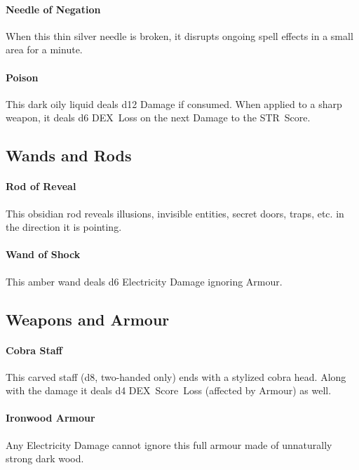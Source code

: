 \documentclass[itdr]{subfiles}
\begin{document}
\paragraph{Needle of Negation}
When this thin silver needle is broken, it disrupts ongoing spell effects in a small area for a minute.

\paragraph{Poison}
This dark oily liquid deals d12 Damage if consumed. When applied to a sharp weapon, it deals d6 DEX~Loss on the next Damage to the STR~Score.

\vfill

\subsection*{Wands and Rods}

\paragraph{Rod of Reveal}
This obsidian rod reveals illusions, invisible entities, secret doors, traps, etc. in the direction it is pointing.

\paragraph{Wand of Shock}
This amber wand deals d6 Electricity Damage \mbox{ignoring} Armour.

\vfill

\subsection*{Weapons and Armour}

\paragraph{Cobra Staff}
This carved staff (d8, two-handed only) ends with a stylized cobra head. Along with the damage it deals d4 DEX~Score~Loss (affected by Armour) as well.

\paragraph{Ironwood Armour}
Any Electricity Damage cannot ignore this full \mbox{armour} made of unnaturally strong dark wood.
\end{document}
